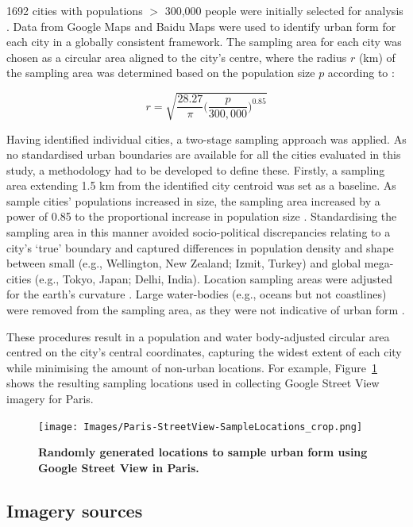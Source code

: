 \documentclass[Crown,sageh,times]{sagej}
\begin{document}
1692 cities with populations $>$ 300,000 people were initially selected for analysis \citep{UN2014}. Data from Google Maps and Baidu Maps were used to identify urban form for each city in a globally consistent framework. The sampling area for each city was chosen as a circular area aligned to the city's centre, where the radius $r$ (km) of the sampling area was determined based on the population size $p$ according to \citet{Barthelemy2016}: 

\begin{equation}
r = \sqrt{ \frac{28.27}{\pi} \bigg( \frac{p}{300,000}  \bigg)^{0.85} }
\end{equation}


Having identified individual cities, a two-stage sampling approach was applied. As no standardised urban boundaries are available for all the cities evaluated in this study, a methodology had to be developed to define these. Firstly, a sampling area extending 1.5 km from the identified city centroid \citep{UN2014} was set as a baseline. As sample cities' populations increased in size, the sampling area increased by a power of 0.85 to the proportional increase in population size \citep{Barthelemy2016}. Standardising the sampling area in this manner avoided socio-political discrepancies relating to a city's `true' boundary and captured differences in population density and shape between small (e.g., Wellington, New Zealand; Izmit, Turkey) and global mega-cities (e.g., Tokyo, Japan;  Delhi, India). Location sampling areas were adjusted for the earth's curvature \citep{Sinnott1984}. Large water-bodies (e.g., oceans but not coastlines) were removed from the sampling area, as they were not indicative of urban form . 

These procedures result in a population and water body-adjusted circular area centred on the city's central coordinates, capturing the widest extent of each city while minimising the amount of non-urban locations. For example, Figure~\ref{fig:parissample} shows the resulting sampling locations used in collecting Google Street View imagery for Paris. 


\begin{figure}[!htbp] 
\centering    
\texttt{[image: Images/Paris-StreetView-SampleLocations\_crop.png]} 
\caption{\bf Randomly generated locations to sample urban form using Google Street View in Paris.} 
\label{fig:parissample}  
\end{figure}

\label{methodsimagery}
\subsection{Imagery sources}
\end{document}
